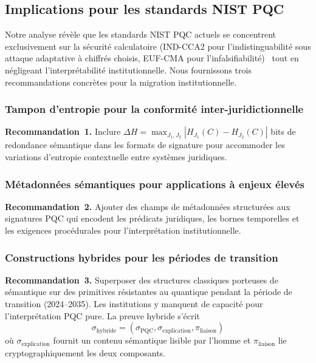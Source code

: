 \subsection{Implications pour les standards NIST PQC}
\label{subsec:implications_standards}
\begin{sloppypar}
Notre analyse r\'ev\`ele que les standards NIST PQC actuels se concentrent
exclusivement sur la s\'ecurit\'e calculatoire (IND-CCA2 pour l'indistinguabilit\'e sous attaque adaptative \`a chiffr\'es choisis,
EUF-CMA pour l'infalsifiabilit\'e)~\cite{Goldreich01,KatzLindell14} tout en n\'egligeant
l'interpr\'etabilit\'e institutionnelle. Nous fournissons trois recommandations
concr\`etes pour la migration institutionnelle.

\subsubsection{Tampon d'entropie pour la conformit\'e inter-juridictionnelle}

\textbf{Recommandation~1.} Inclure $\Delta H = \max_{J_1, J_2} |H_{J_1}(C) - H_{J_2}(C)|$
bits de redondance s\'emantique dans les formats de signature pour accommoder
les variations d'entropie contextuelle entre syst\`emes juridiques.

\subsubsection{M\'etadonn\'ees s\'emantiques pour applications \`a enjeux \'elev\'es}

\textbf{Recommandation~2.} Ajouter des champs de m\'etadonn\'ees
structur\'ees aux signatures PQC qui encodent les pr\'edicats juridiques, les
bornes temporelles et les exigences proc\'edurales pour l'interpr\'etation
institutionnelle.

\subsubsection{Constructions hybrides pour les p\'eriodes de transition}

\textbf{Recommandation~3.} Superposer des structures classiques porteuses de
s\'emantique sur des primitives r\'esistantes au quantique pendant la
p\'eriode de transition (2024--2035). Les institutions y manquent de
capacit\'e pour l'interpr\'etation PQC pure. La preuve hybride s'\'ecrit
\begin{equation}
\sigma_{\text{hybride}} = (\sigma_{\text{PQC}}, \sigma_{\text{explication}},
\pi_{\text{liaison}})
\end{equation}
o\`u $\sigma_{\text{explication}}$ fournit un contenu s\'emantique lisible par
l'homme et $\pi_{\text{liaison}}$ lie cryptographiquement les deux composants.
\end{sloppypar}

